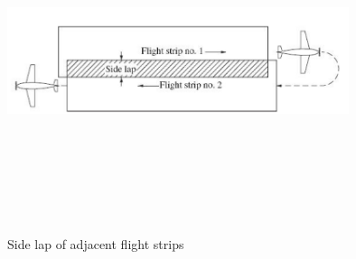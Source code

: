 \begin{figure}[H]
\centering
\includegraphics[width=10cm,height=10cm,keepaspectratio]{imagenes/sidelap.PNG}
\caption{Side lap of adjacent flight strips}
\label{fig:SideLap}
\end{figure}

